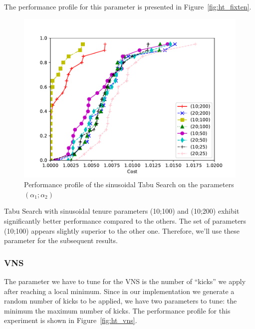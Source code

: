 \documentclass{article}
\begin{document}
The performance profile for this parameter is presented in Figure~\ref{fig:ht_fixten}.

\begin{figure}[ht]
        \caption{Performance profile of the sinusoidal Tabu Search on the parameters $\left(\alpha_1; \alpha_2\right)$}
        \label{fig:ht_sinten}
        \centering
        \includegraphics[width=340pt]{assets/ht_sinten.pdf}
\end{figure}

Tabu Search with sinusoidal tenure parameters (10;100) and (10;200) exhibit significantly better performance compared to the others.
The set of parameters (10;100) appears slightly superior to the other one. Therefore, we'll use these parameter for the
subsequent results.

\clearpage

\subsubsection{VNS}
The parameter we have to tune for the VNS is the number of ``kicks'' we apply
after reaching a local minimum. Since in our implementation we generate a
random number of kicks to be applied, we have two parameters to tune: the
minimum the maximum number of kicks.
The performance profile for this experiment is shown in Figure~\ref{fig:ht_vns}.
\end{document}
